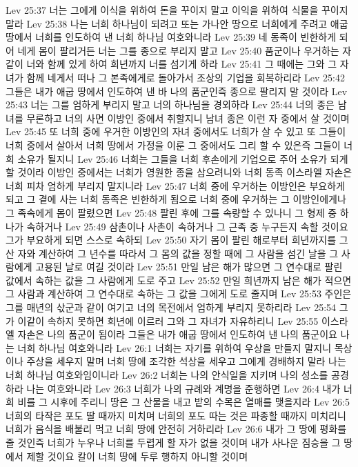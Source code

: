 Lev 25:37  너는 그에게 이식을 위하여 돈을 꾸이지 말고 이익을 위하여 식물을 꾸이지 말라
Lev 25:38  나는 너희 하나님이 되려고 또는 가나안 땅으로 너희에게 주려고 애굽 땅에서 너희를 인도하여 낸 너희 하나님 여호와니라
Lev 25:39  네 동족이 빈한하게 되어 네게 몸이 팔리거든 너는 그를 종으로 부리지 말고
Lev 25:40  품군이나 우거하는 자같이 너와 함께 있게 하여 희년까지 너를 섬기게 하라
Lev 25:41  그 때에는 그와 그 자녀가 함께 네게서 떠나 그 본족에게로 돌아가서 조상의 기업을 회복하리라
Lev 25:42  그들은 내가 애굽 땅에서 인도하여 낸 바 나의 품군인즉 종으로 팔리지 말 것이라
Lev 25:43  너는 그를 엄하게 부리지 말고 너의 하나님을 경외하라
Lev 25:44  너의 종은 남녀를 무론하고 너의 사면 이방인 중에서 취할지니 남녀 종은 이런 자 중에서 살 것이며
Lev 25:45  또 너희 중에 우거한 이방인의 자녀 중에서도 너희가 살 수 있고 또 그들이 너희 중에서 살아서 너희 땅에서 가정을 이룬 그 중에서도 그리 할 수 있은즉 그들이 너희 소유가 될지니
Lev 25:46  너희는 그들을 너희 후손에게 기업으로 주어 소유가 되게 할 것이라 이방인 중에서는 너희가 영원한 종을 삼으려니와 너희 동족 이스라엘 자손은 너희 피차 엄하게 부리지 말지니라
Lev 25:47  너희 중에 우거하는 이방인은 부요하게 되고 그 곁에 사는 너희 동족은 빈한하게 됨으로 너희 중에 우거하는 그 이방인에게나 그 족속에게 몸이 팔렸으면
Lev 25:48  팔린 후에 그를 속량할 수 있나니 그 형제 중 하나가 속하거나
Lev 25:49  삼촌이나 사촌이 속하거나 그 근족 중 누구든지 속할 것이요 그가 부요하게 되면 스스로 속하되
Lev 25:50  자기 몸이 팔린 해로부터 희년까지를 그 산 자와 계산하여 그 년수를 따라서 그 몸의 값을 정할 때에 그 사람을 섬긴 날을 그 사람에게 고용된 날로 여길 것이라
Lev 25:51  만일 남은 해가 많으면 그 연수대로 팔린 값에서 속하는 값을 그 사람에게 도로 주고
Lev 25:52  만일 희년까지 남은 해가 적으면 그 사람과 계산하여 그 연수대로 속하는 그 값을 그에게 도로 줄지며
Lev 25:53  주인은 그를 매년의 삯군과 같이 여기고 너의 목전에서 엄하게 부리지 못하리라
Lev 25:54  그가 이같이 속하지 못하면 희년에 이르러 그와 그 자녀가 자유하리니
Lev 25:55  이스라엘 자손은 나의 품군이 됨이라 그들은 내가 애굽 땅에서 인도하여 낸 나의 품군이요 나는 너희 하나님 여호와니라
Lev 26:1  너희는 자기를 위하여 우상을 만들지 말지니 목상이나 주상을 세우지 말며 너희 땅에 조각한 석상을 세우고 그에게 경배하지 말라 나는 너희 하나님 여호와임이니라
Lev 26:2  너희는 나의 안식일을 지키며 나의 성소를 공경하라 나는 여호와니라
Lev 26:3  너희가 나의 규례와 계명을 준행하면
Lev 26:4  내가 너희 비를 그 시후에 주리니 땅은 그 산물을 내고 밭의 수목은 열매를 맺을지라
Lev 26:5  너희의 타작은 포도 딸 때까지 미치며 너희의 포도 따는 것은 파종할 때까지 미치리니 너희가 음식을 배불리 먹고 너희 땅에 안전히 거하리라
Lev 26:6  내가 그 땅에 평화를 줄 것인즉 너희가 누우나 너희를 두렵게 할 자가 없을 것이며 내가 사나운 짐승을 그 땅에서 제할 것이요 칼이 너희 땅에 두루 행하지 아니할 것이며

